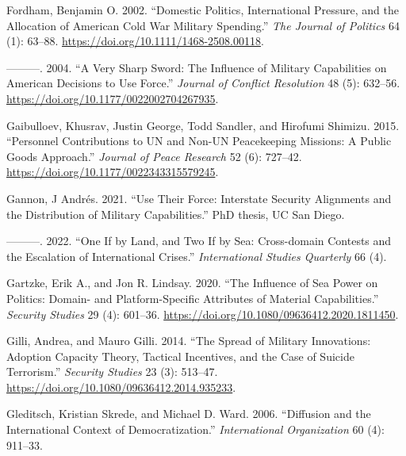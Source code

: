 \documentclass[
]{article}
\newlength{\cslhangindent}
\newlength{\cslentryspacingunit} %
\newenvironment{CSLReferences}[2] %
 {%
  \setlength{\parindent}{0pt}
  \ifodd #1
  \let\oldpar\par
  \def\par{\hangindent=\cslhangindent\oldpar}
  \fi
  \setlength{\parskip}{#2\cslentryspacingunit}
 }%
 {}
\begin{document}
\begin{CSLReferences}{1}{0}
\leavevmode{}%
Fordham, Benjamin O. 2002. {``Domestic {Politics}, {International Pressure}, and the {Allocation} of {American Cold War Military Spending}.''} \emph{The Journal of Politics} 64 (1): 63--88. \url{https://doi.org/10.1111/1468-2508.00118}.

\leavevmode{}%
---------. 2004. {``A {Very Sharp Sword}: {The Influence} of {Military Capabilities} on {American Decisions} to {Use Force}.''} \emph{Journal of Conflict Resolution} 48 (5): 632--56. \url{https://doi.org/10.1177/0022002704267935}.

\leavevmode{}%
Gaibulloev, Khusrav, Justin George, Todd Sandler, and Hirofumi Shimizu. 2015. {``Personnel Contributions to {UN} and Non-{UN} Peacekeeping Missions: {A} Public Goods Approach.''} \emph{Journal of Peace Research} 52 (6): 727--42. \url{https://doi.org/10.1177/0022343315579245}.

\leavevmode{}%
Gannon, J Andrés. 2021. {``Use {Their Force}: {Interstate Security Alignments} and the {Distribution} of {Military Capabilities}.''} PhD thesis, UC San Diego.

\leavevmode{}%
---------. 2022. {``One If by Land, and Two If by Sea: {Cross-domain} Contests and the Escalation of International Crises.''} \emph{International Studies Quarterly} 66 (4).

\leavevmode{}%
Gartzke, Erik A., and Jon R. Lindsay. 2020. {``The {Influence} of {Sea Power} on {Politics}: {Domain-} and {Platform-Specific Attributes} of {Material Capabilities}.''} \emph{Security Studies} 29 (4): 601--36. \url{https://doi.org/10.1080/09636412.2020.1811450}.

\leavevmode{}%
Gilli, Andrea, and Mauro Gilli. 2014. {``The {Spread} of {Military Innovations}: {Adoption Capacity Theory}, {Tactical Incentives}, and the {Case} of {Suicide Terrorism}.''} \emph{Security Studies} 23 (3): 513--47. \url{https://doi.org/10.1080/09636412.2014.935233}.

\leavevmode{}%
Gleditsch, Kristian Skrede, and Michael D. Ward. 2006. {``Diffusion and the {International Context} of {Democratization}.''} \emph{International Organization} 60 (4): 911--33.


\end{CSLReferences}
\end{document}
